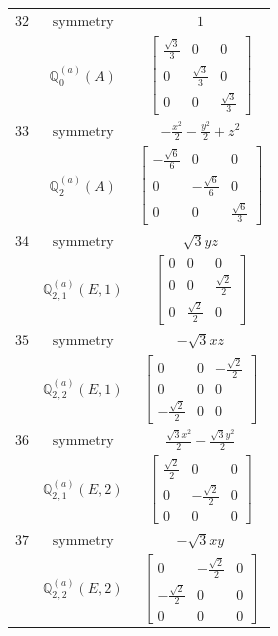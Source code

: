 \documentclass[fleqn,8pt,landscape]{jsarticle}
\begin{document}
\begin{longtable}{ccc}
$ 32 $ & $ \text{symmetry} $ & $ 1 $ \\
$  $ & $ \mathbb{Q}_{0}^{(a)}(A) $ & $ \begin{bmatrix} \frac{\sqrt{3}}{3} & 0 & 0 \\ 0 & \frac{\sqrt{3}}{3} & 0 \\ 0 & 0 & \frac{\sqrt{3}}{3} \end{bmatrix} $ \\ \hline
$ 33 $ & $ \text{symmetry} $ & $ - \frac{x^{2}}{2} - \frac{y^{2}}{2} + z^{2} $ \\
$  $ & $ \mathbb{Q}_{2}^{(a)}(A) $ & $ \begin{bmatrix} - \frac{\sqrt{6}}{6} & 0 & 0 \\ 0 & - \frac{\sqrt{6}}{6} & 0 \\ 0 & 0 & \frac{\sqrt{6}}{3} \end{bmatrix} $ \\ \hline
$ 34 $ & $ \text{symmetry} $ & $ \sqrt{3} y z $ \\
$  $ & $ \mathbb{Q}_{2,1}^{(a)}(E,1) $ & $ \begin{bmatrix} 0 & 0 & 0 \\ 0 & 0 & \frac{\sqrt{2}}{2} \\ 0 & \frac{\sqrt{2}}{2} & 0 \end{bmatrix} $ \\ \hline
$ 35 $ & $ \text{symmetry} $ & $ - \sqrt{3} x z $ \\
$  $ & $ \mathbb{Q}_{2,2}^{(a)}(E,1) $ & $ \begin{bmatrix} 0 & 0 & - \frac{\sqrt{2}}{2} \\ 0 & 0 & 0 \\ - \frac{\sqrt{2}}{2} & 0 & 0 \end{bmatrix} $ \\ \hline
$ 36 $ & $ \text{symmetry} $ & $ \frac{\sqrt{3} x^{2}}{2} - \frac{\sqrt{3} y^{2}}{2} $ \\
$  $ & $ \mathbb{Q}_{2,1}^{(a)}(E,2) $ & $ \begin{bmatrix} \frac{\sqrt{2}}{2} & 0 & 0 \\ 0 & - \frac{\sqrt{2}}{2} & 0 \\ 0 & 0 & 0 \end{bmatrix} $ \\ \hline
$ 37 $ & $ \text{symmetry} $ & $ - \sqrt{3} x y $ \\
$  $ & $ \mathbb{Q}_{2,2}^{(a)}(E,2) $ & $ \begin{bmatrix} 0 & - \frac{\sqrt{2}}{2} & 0 \\ - \frac{\sqrt{2}}{2} & 0 & 0 \\ 0 & 0 & 0 \end{bmatrix} $ \\ \hline

\end{longtable}
\end{document}
